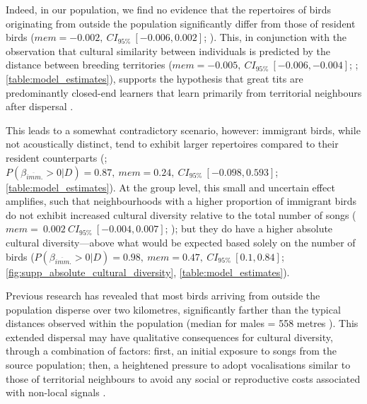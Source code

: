 \documentclass[9pt, twocolumn, twoside]{gsajnl}
\begin{document}
Indeed, in our population, we find no evidence that the repertoires of birds originating from outside the population significantly differ from those of resident birds ($mem = -0.002,~CI_{95\%}~[-0.006, 0.002]$; ). This, in conjunction with the observation that cultural similarity between individuals is predicted by the distance between breeding territories ($mem = -0.005,~CI_{95\%}~[-0.006, -0.004]$; ; \autoref{table:model_estimates}), supports the hypothesis that great tits are predominantly closed-end learners that learn primarily from territorial neighbours after dispersal \parencite{mcgregor1982b, rivera-gutierrez2011, graham2017}.

This leads to a somewhat contradictory scenario, however: immigrant birds, while not acoustically distinct, tend to exhibit larger repertoires compared to their resident counterparts (; $P(\beta_{\overline{imm}.} > 0 | D) = 0.87,~mem=0.24,~CI_{95\%}~[-0.098, 0.593]$; \autoref{table:model_estimates}). At the group level, this small and uncertain effect amplifies, such that neighbourhoods with a higher proportion of immigrant birds do not exhibit increased cultural diversity relative to the total number of songs ($mem=~0.002~CI_{95\%}~[-0.004, 0.007]$; ); but they do have a higher absolute cultural diversity---above what would be expected based solely on the number of birds ($P(\beta_{\overline{imm}.} > 0 | D) = 0.98,~mem=0.47,~CI_{95\%}~[0.1, 0.84]$; \autoref{fig:supp_absolute_cultural_diversity}, \autoref{table:model_estimates}). 

Previous research \parencite{verhulst1997}  has revealed that most birds arriving from outside the population disperse over two kilometres, significantly farther than the typical distances observed within the population (median for males = 558 metres \cite{greenwood1979}). This extended dispersal may have qualitative consequences for cultural diversity, through a combination of factors: first, an initial exposure to songs from the source population; then, a heightened pressure to adopt vocalisations similar to those of territorial neighbours to avoid any social or reproductive costs associated with non-local signals \parencite{payne1983, baker1981, mortega2014, lachlan2014, beecher2008}.
\end{document}
